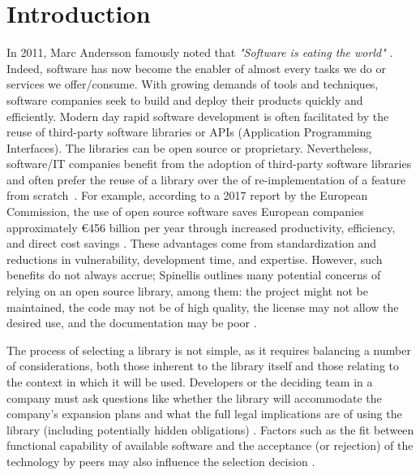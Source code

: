 \documentclass[sigconf,review,anonymous, table]{acmart}
\begin{document}
\maketitle
\balance
\section{Introduction}
In 2011, Marc Andersson famously noted that \textit{"Software is eating the world"} \cite{website:eat-world}. Indeed, software has now become the enabler of almost every tasks we do or services we offer/consume. With growing demands of tools and techniques, software companies seek to build and deploy their products quickly and efficiently. Modern day rapid software development is often facilitated by the reuse of third-party software libraries or APIs (Application Programming Interfaces). The libraries can be open source or proprietary. Nevertheless, software/IT companies benefit from the adoption of third-party software libraries and often prefer the reuse of a library over the of re-implementation of a feature from scratch~\cite{uddin2017opiner}. For example, according to a 2017 report by the European Commission, the use of open source software saves European companies approximately \euro456 billion per year through increased productivity, efficiency, and direct cost savings \cite{eu2017economic}. These advantages come from standardization and reductions in vulnerability, development time, and expertise. However, such benefits do not always accrue; Spinellis outlines many potential concerns of relying on an open source library, among them: the project might not be maintained, the code may not be of high quality, the license may not allow the desired use, and the documentation may be poor \cite{spinellis2019select}.

The process of selecting a library is not simple, as it requires balancing a number of considerations, both those inherent to the library itself and those relating to the context in which it will be used. Developers or the deciding team in a company must ask questions like whether the library will accommodate the company's expansion plans and what the full legal implications are of using the library (including potentially hidden obligations) 
\cite{spinellis2019select,wolter:2022:open}. Factors such as the fit between functional capability of available software and the acceptance (or rejection) of the technology by peers may also influence the selection decision \cite{dishaw1998supporting,eckhardt2009influences}. %
\end{document}
